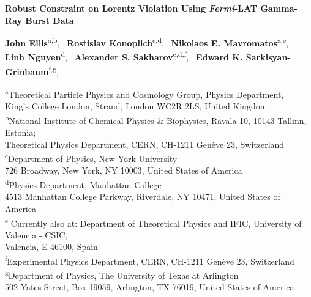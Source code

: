 \documentclass[12pt]{article}
\begin{document}
\pagestyle{plain}

\baselineskip=21pt

\begin{center}

{\large {\bf Robust Constraint on Lorentz Violation Using {\bf\it Fermi}-LAT Gamma-Ray Burst Data}}

\vskip 0.1in

{\bf John Ellis}\textsuperscript{a,b},~%
{\bf Rostislav Konoplich}\textsuperscript{c,d},~%
{\bf Nikolaos E. Mavromatos}\textsuperscript{a,e},~\\%
{\bf Linh Nguyen}\textsuperscript{d},~%
{\bf Alexander S. Sakharov}\textsuperscript{c,d,f},~%
{\bf Edward K. Sarkisyan-Grinbaum}\textsuperscript{f,g},~\\%

\vskip 0.1in

{\small {\it

\textsuperscript{a}Theoretical Particle Physics and Cosmology Group, Physics Department, \\
King's College London, Strand, London WC2R 2LS, United Kingdom\\
\vspace{0.25cm}
\textsuperscript{b}National Institute of Chemical Physics \& Biophysics, R{\" a}vala 10, 10143 Tallinn, Estonia; \\
Theoretical Physics Department, CERN, CH-1211 Gen\`eve 23, Switzerland\\
\vspace{0.25cm}
\textsuperscript{c}Department of Physics, New York University\\
726 Broadway, New York, NY 10003, United States of America\\
\vspace{0.25cm}
\textsuperscript{d}Physics Department, Manhattan College\\
{\mbox 4513 Manhattan College Parkway, Riverdale, NY 10471, United States of America}\\
\vspace{0.25cm}
\textsuperscript{e} Currently also at: Department of Theoretical Physics and IFIC, University of Valencia - CSIC, \\
{\mbox  Valencia, E-46100, Spain }\\
\vspace{0.25cm}
\textsuperscript{f}Experimental Physics Department, CERN, CH-1211 Gen\`eve 23, Switzerland \\
\vspace{0.25cm}
\textsuperscript{g}Department of Physics, The University of Texas at Arlington\\
{\mbox 502 Yates Street, Box 19059, Arlington, TX 76019, United States of America} \\
}
}


\end{center}
\end{document}
